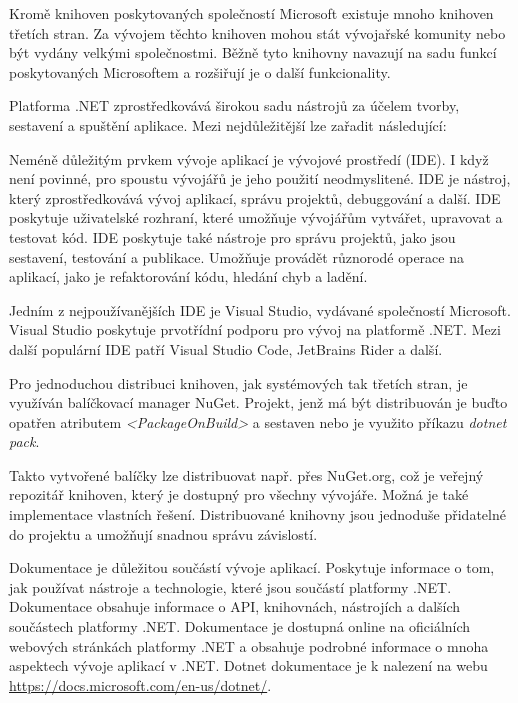 
Kromě knihoven poskytovaných společností Microsoft existuje mnoho knihoven třetích stran. Za vývojem těchto knihoven mohou stát vývojařské komunity nebo být vydány velkými společnostmi. Běžně tyto knihovny navazují na sadu funkcí poskytovaných Microsoftem a rozšiřují je o další funkcionality.


Platforma .NET zprostředkovává širokou sadu nástrojů za účelem tvorby, sestavení a spuštění aplikace. Mezi nejdůležitější lze zařadit následující:


Neméně důležitým prvkem vývoje aplikací je vývojové prostředí (IDE). I když není povinné, pro spoustu vývojářů je jeho použití neodmyslitené. IDE je nástroj, který zprostředkovává vývoj aplikací, správu projektů, debuggování a další. IDE poskytuje uživatelské rozhraní, které umožňuje vývojářům vytvářet, upravovat a testovat kód. IDE poskytuje také nástroje pro správu projektů, jako jsou sestavení, testování a publikace. Umožňuje provádět různorodé operace na aplikací, jako je refaktorování kódu, hledání chyb a ladění.

Jedním z nejpoužívanějších IDE je Visual Studio, vydávané společností Microsoft. Visual Studio poskytuje prvotřídní podporu pro vývoj na platformě .NET. Mezi další populární IDE patří Visual Studio Code, JetBrains Rider a další.



Pro jednoduchou distribuci knihoven, jak systémových tak třetích stran, je využíván balíčkovací manager NuGet. Projekt, jenž má být distribuován je buďto opatřen atributem \emph{<PackageOnBuild>} a sestaven nebo je využito příkazu \emph{dotnet pack}. 

Takto vytvořené balíčky lze distribuovat např. přes NuGet.org, což je veřejný repozitář knihoven, který je dostupný pro všechny vývojáře. Možná je také implementace vlastních řešení. Distribuované knihovny jsou jednoduše přidatelné do projektu a umožňují snadnou správu závislostí.


Dokumentace je důležitou součástí vývoje aplikací. Poskytuje informace o tom, jak používat nástroje a technologie, které jsou součástí platformy .NET. Dokumentace obsahuje informace o API, knihovnách, nástrojích a dalších součástech platformy .NET. Dokumentace je dostupná online na oficiálních webových stránkách platformy .NET a obsahuje podrobné informace o mnoha aspektech vývoje aplikací v .NET. Dotnet dokumentace je k nalezení na webu \url{https://docs.microsoft.com/en-us/dotnet/}.

